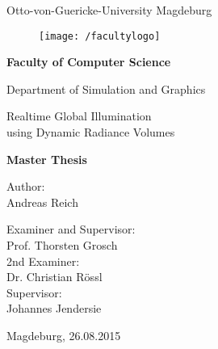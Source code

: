 \documentclass[thesis.tex]{subfiles}
\begin{document}
\thispagestyle {empty}

\begin{center}
\begin{Large}
Otto-von-Guericke-University Magdeburg\\

\begin{figure}
	\centering
	\texttt{[image: /facultylogo]}
	\label{fig:logoinffak}
\end{figure}

\vspace{3mm}

\textbf{Faculty of Computer Science}\\
\end{Large}

\vspace{3mm}

Department of Simulation and Graphics\\

\vspace{1cm}
\begin{Huge}
Realtime Global Illumination\\using Dynamic Radiance Volumes\\
\end{Huge}
\vspace{15mm}
{\Huge \textbf{Master Thesis}}\\
\vspace{15mm}

Author:\\
\vspace{4mm}
{\huge Andreas Reich}\\

\vspace{16mm}

Examiner and Supervisor:\\
\vspace{2mm}
{\Large Prof. Thorsten Grosch}\\
\vspace{4mm}
2nd Examiner:\\
\vspace{2mm}
{\Large Dr. Christian Rössl}\\
\vspace{10mm}
Supervisor:\\
\vspace{2mm}
{\large Johannes Jendersie}\\


\vspace{25mm}

{\large Magdeburg, 26.08.2015}\\

\vspace{40mm}

\end{center}
\clearpage
\end{document}
